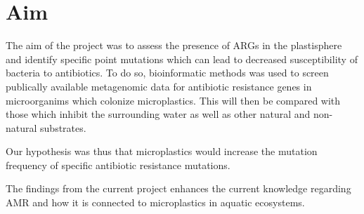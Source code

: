 




\section{Aim} %
The aim of the project was to assess the presence of ARGs in the plastisphere and identify specific point mutations which can lead to decreased susceptibility of bacteria to antibiotics.
To do so, bioinformatic methods was used to screen publically available metagenomic data for antibiotic resistance genes in microorganims which colonize microplastics. This will then be compared with those which inhibit the surrounding water as well as other natural and non-natural substrates.

Our hypothesis was thus that microplastics would increase the mutation frequency of specific antibiotic resistance mutations.

The findings from the current project enhances the current knowledge regarding AMR and how it is connected to microplastics in aquatic ecosystems.




